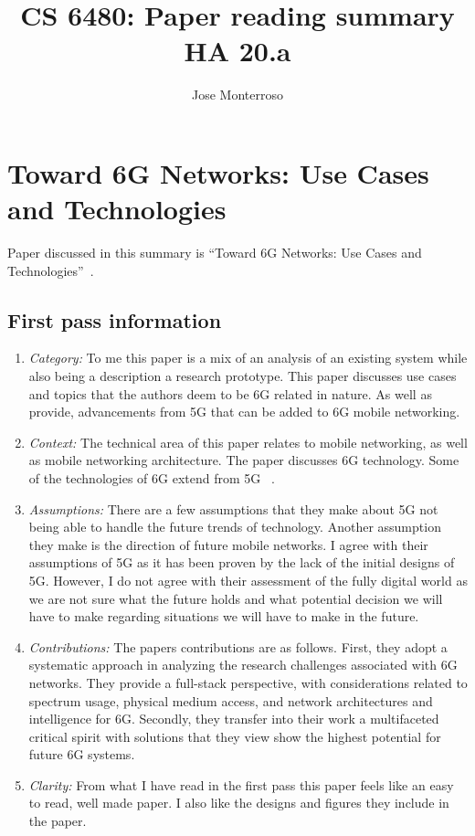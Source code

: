 \documentclass[letterpaper,twocolumn,10pt]{article}
\title{CS 6480: Paper reading summary\\
HA 20.a\\}
\author{Jose Monterroso}
\affil{School of Computing, University of Utah}
\begin{document}
\maketitle
\section{Toward 6G Networks: Use Cases and Technologies}

Paper discussed in this summary is ``Toward 6G Networks: Use Cases and Technologies''~\cite{6g}.

\subsection{First pass information}
\label{sec:first}
\begin{enumerate}

\item {\it Category:} 
To me this paper is a mix of an analysis of an existing system while also being a description a research prototype.
This paper discusses use cases and topics that the authors deem to be 6G related in nature. As well as provide,
advancements from 5G that can be added to 6G mobile networking. 

\item {\it Context:}
The technical area of this paper relates to mobile networking, as well as mobile networking architecture. The paper discusses
6G technology. Some of the technologies of 6G extend from 5G ~\cite{5gwhite}.

\item {\it Assumptions:}  
There are a few assumptions that they make about 5G not being able to handle the future trends of technology. Another
assumption they make is the direction of future mobile networks. I agree with their assumptions of 5G as it has
been proven by the lack of the initial designs of 5G. However, I do not agree with their assessment of the 
fully digital world as we are not sure what the future holds and what potential decision we will have to make 
regarding situations we will have to make in the future. 

\item {\it Contributions:} 
The papers contributions are as follows. First, they adopt a systematic approach in analyzing the research 
challenges associated with 6G networks. They provide a full-stack perspective, with considerations related to 
spectrum usage, physical medium access, and network architectures and intelligence for 6G. Secondly, they 
transfer into their work a multifaceted critical spirit with solutions that they view show the highest potential for 
future 6G systems. 

\item {\it Clarity:} From what I have read in the first pass this paper feels like an easy to read, well made
paper. I also like the designs and figures they include in the paper.

\end{enumerate}
\end{document}
